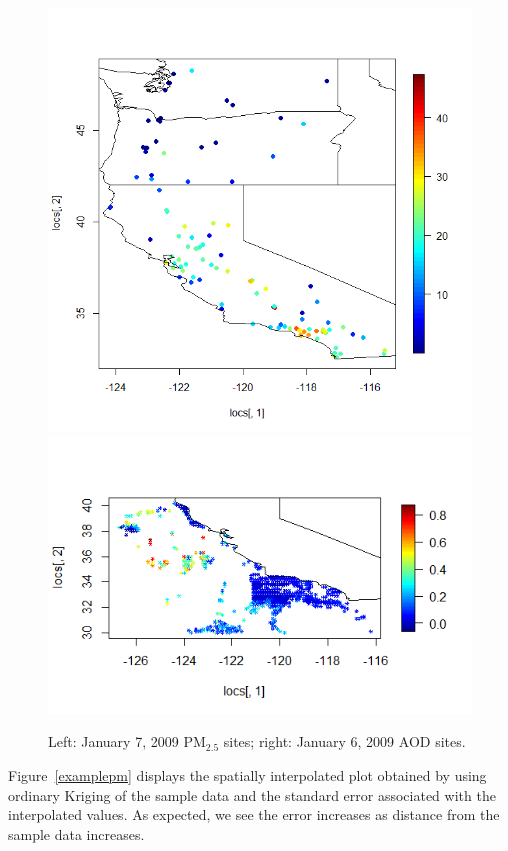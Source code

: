 \documentclass[10pt]{article}
\begin{document}
\begin{figure}[H]
\centering
  \includegraphics[width=.45\textwidth]{SamplePoints07012009.png}
  \includegraphics[width= .45\textwidth]{AODpoints_06012009.png}
  \caption{Left: January 7, 2009 PM$_{2.5}$ sites; right: January 6, 2009 AOD sites.}
\label{aodpm}
\end{figure}


Figure~\ref{examplepm} displays the spatially interpolated plot obtained by
using ordinary Kriging of the sample data and the standard error associated
with the interpolated values. As expected, we see the error increases as
distance from the sample data increases. 
\end{document}
